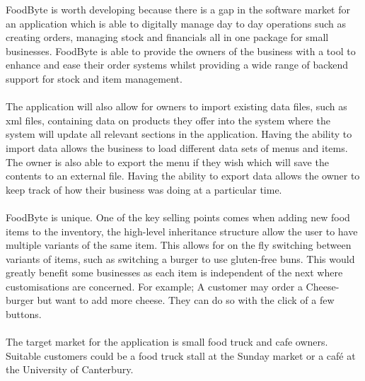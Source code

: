 FoodByte is worth developing because there is a gap in the software market for an application which is able to digitally manage day to day operations such as creating orders, managing stock and financials all in one package for small businesses. FoodByte is able to provide the owners of the business with a tool to enhance and ease their order systems whilst providing a wide range of backend support for stock and item management.
\\ \\
The application will also allow for owners to import existing data files, such as xml files, containing data on products they offer into the system where the system will update all relevant sections in the application. Having the ability to import data allows the business to load different data sets of menus and items. The owner is also able to export the menu if they wish which will save the contents to an external file. Having the ability to export data allows the owner to keep track of how their business was doing at a particular time.
\\ \\
FoodByte is unique. One of the key selling points comes when adding new food items to the inventory, the high-level inheritance structure allow the user to have multiple variants of the same item. This allows for on the fly switching between variants of items, such as switching a burger to use gluten-free buns. This would greatly benefit some businesses as each item is independent of the next where customisations are concerned. For example; A customer may order a Cheese-burger but want to add more cheese. They can do so with the click of a few buttons.
\\ \\
The target market for the application is small food truck and cafe owners. Suitable customers could be a food truck stall at the Sunday market or a café at the University of Canterbury.